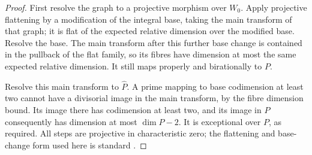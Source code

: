 \begin{proof}
First resolve the graph to a projective morphism over $W_0$.  Apply
projective flattening by a modification of the integral base, taking
the main transform of that graph; it is flat of the expected relative
dimension over the modified base.  Resolve the base.  The main
transform after this further base change is contained in the pullback
of the flat family, so its fibres have dimension at most the same
expected relative dimension.  It still maps properly and birationally
to $P$.

Resolve this main transform to $\widehat P$.  A prime mapping to
base codimension at least two cannot have a divisorial image in the
main transform, by the fibre dimension bound.  Its image there has
codimension at least two, and its image in $P$ consequently has
dimension at most $\dim P-2$.  It is exceptional over $P$, as
required.  All steps are projective in characteristic zero; the
flattening and base-change form used here is standard
\cite{Stacks,Hironaka}.
\end{proof}


